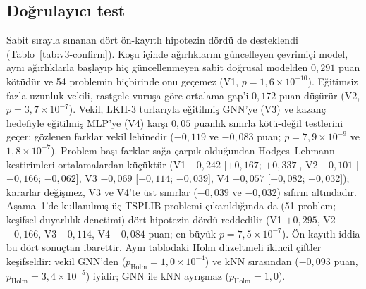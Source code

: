 \documentclass[pdflatex,sn-basic]{sn-jnl}
\begin{document}
\subsection{Doğrulayıcı test}\label{sec:bulgular-dogrulayici}

Sabit sırayla sınanan dört ön-kayıtlı hipotezin dördü de desteklendi
(Tablo~\ref{tab:v3-confirm}). Koşu içinde ağırlıklarını güncelleyen çevrimiçi model, aynı ağırlıklarla
başlayıp hiç güncellenmeyen sabit doğrusal modelden $0{,}291$ puan kötüdür ve 54 problemin hiçbirinde
onu geçemez (V1, $p=1{,}6\times10^{-10}$).
Eğitimsiz fazla-uzunluk vekili, rastgele vuruşa göre ortalama gap'i $0{,}172$ puan düşürür
(V2, $p=3{,}7\times10^{-7}$).
Vekil, LKH-3 turlarıyla eğitilmiş GNN'ye (V3) ve kazanç hedefiyle eğitilmiş MLP'ye (V4) karşı
$0{,}05$ puanlık sınırla kötü-değil testlerini geçer; gözlenen farklar vekil lehinedir ($-0{,}119$
ve $-0{,}083$ puan; $p=7{,}9\times10^{-9}$ ve $1{,}8\times10^{-7}$).
Problem başı farklar sağa çarpık olduğundan Hodges--Lehmann kestirimleri ortalamalardan küçüktür
(V1 $+0{,}242$ [$+0{,}167$; $+0{,}337$], V2 $-0{,}101$ [$-0{,}166$; $-0{,}062$], V3 $-0{,}069$
[$-0{,}114$; $-0{,}039$], V4 $-0{,}057$ [$-0{,}082$; $-0{,}032$]); kararlar değişmez, V3
ve V4'te üst sınırlar ($-0{,}039$ ve $-0{,}032$) sıfırın altındadır.
Aşama~1'de kullanılmış üç TSPLIB problemi çıkarıldığında da (51 problem; keşifsel duyarlılık
denetimi) dört hipotezin dördü reddedilir (V1 $+0{,}295$, V2 $-0{,}166$, V3 $-0{,}114$, V4 $-0{,}084$
puan; en büyük $p=7{,}5\times10^{-7}$).
Ön-kayıtlı iddia bu dört sonuçtan ibarettir. Aynı tablodaki Holm düzeltmeli ikincil çiftler
keşifseldir: vekil GNN'den ($p_{\mathrm{Holm}}=1{,}0\times10^{-4}$) ve kNN sırasından ($-0{,}093$ puan,
$p_{\mathrm{Holm}}=3{,}4\times10^{-5}$) iyidir; GNN ile kNN ayrışmaz ($p_{\mathrm{Holm}}=1{,}0$).
\end{document}
